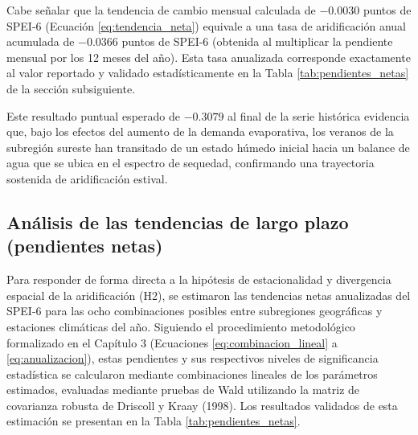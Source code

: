 Cabe señalar que la tendencia de cambio mensual calculada de $-0.0030$ puntos de SPEI-6 (Ecuación \ref{eq:tendencia_neta}) equivale a una tasa de aridificación anual acumulada de $-0.0366$ puntos de SPEI-6 (obtenida al multiplicar la pendiente mensual por los 12 meses del año). Esta tasa anualizada corresponde exactamente al valor reportado y validado estadísticamente en la Tabla \ref{tab:pendientes_netas} de la sección subsiguiente. 

Este resultado puntual esperado de $-0.3079$ al final de la serie histórica evidencia que, bajo los efectos del aumento de la demanda evaporativa, los veranos de la subregión sureste han transitado de un estado húmedo inicial hacia un balance de agua que se ubica en el espectro de sequedad, confirmando una trayectoria sostenida de aridificación estival.

\subsection{Análisis de las tendencias de largo plazo (pendientes netas)}

Para responder de forma directa a la hipótesis de estacionalidad y divergencia espacial de la aridificación (H2), se estimaron las tendencias netas anualizadas del SPEI-6 para las ocho combinaciones posibles entre subregiones geográficas y estaciones climáticas del año. Siguiendo el procedimiento metodológico formalizado en el Capítulo 3 (Ecuaciones \ref{eq:combinacion_lineal} a \ref{eq:anualizacion}), estas pendientes y sus respectivos niveles de significancia estadística se calcularon mediante combinaciones lineales de los parámetros estimados, evaluadas mediante pruebas de Wald utilizando la matriz de covarianza robusta de Driscoll y Kraay (1998). Los resultados validados de esta estimación se presentan en la Tabla \ref{tab:pendientes_netas}.

